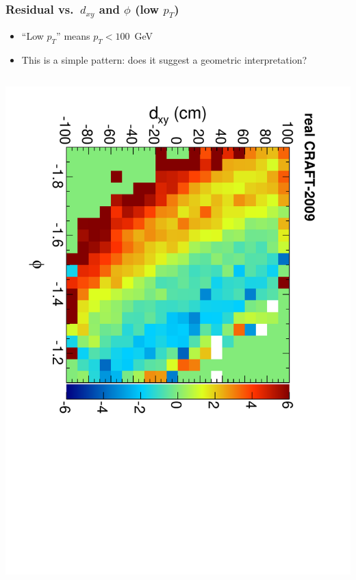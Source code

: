 \documentclass[compress]{beamer}
\begin{document}
\begin{frame}
\frametitle{Residual vs.~$d_{xy}$ and $\phi$ (low $p_T$)}

\begin{itemize}
\item ``Low $p_T$'' means $p_T < 100$~GeV
\item This is a simple pattern: does it suggest a geometric interpretation?
\end{itemize}

\begin{columns}
\includegraphics[height=\linewidth, angle=90]{residx-dxy-phi-low_real.pdf}


\end{columns}
\end{frame}
\end{document}
